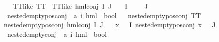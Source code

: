 \begin{isabellebody}
\ \ \isanewline
{\isachardoublequoteopen}TT{\isacharunderscore}{\kern0pt}like\ TT{\isachardoublequoteclose}\ {\isacharbar}{\kern0pt}\isanewline
{\isachardoublequoteopen}TT{\isacharunderscore}{\kern0pt}like\ {\isacharparenleft}{\kern0pt}hml{\isacharunderscore}{\kern0pt}conj\ I\ J\ {\isasymPhi}{\isacharparenright}{\kern0pt}{\isachardoublequoteclose}\ \ {\isachardoublequoteopen}{\isacharparenleft}{\kern0pt}{\isasymPhi}\ {\isacharbackquote}{\kern0pt}I{\isacharparenright}{\kern0pt}\ {\isacharequal}{\kern0pt}\ {\isacharbraceleft}{\kern0pt}{\isacharbraceright}{\kern0pt}{\isachardoublequoteclose}\ {\isachardoublequoteopen}{\isacharparenleft}{\kern0pt}{\isasymPhi}\ {\isacharbackquote}{\kern0pt}\ J{\isacharparenright}{\kern0pt}\ {\isacharequal}{\kern0pt}\ {\isacharbraceleft}{\kern0pt}{\isacharbraceright}{\kern0pt}{\isachardoublequoteclose}\isanewline
\isanewline
{}\isamarkupfalse%
\ nested{\isacharunderscore}{\kern0pt}empty{\isacharunderscore}{\kern0pt}pos{\isacharunderscore}{\kern0pt}conj\ {\isacharcolon}{\kern0pt}{\isacharcolon}{\kern0pt}\ {\isachardoublequoteopen}{\isacharparenleft}{\kern0pt}{\isacharprime}{\kern0pt}a{\isacharcomma}{\kern0pt}\ {\isacharprime}{\kern0pt}i{\isacharparenright}{\kern0pt}\ hml\ {\isasymRightarrow}\ bool{\isachardoublequoteclose}\isanewline
\ \ \isanewline
{\isachardoublequoteopen}nested{\isacharunderscore}{\kern0pt}empty{\isacharunderscore}{\kern0pt}pos{\isacharunderscore}{\kern0pt}conj\ TT{\isachardoublequoteclose}\ {\isacharbar}{\kern0pt}\isanewline
{\isachardoublequoteopen}nested{\isacharunderscore}{\kern0pt}empty{\isacharunderscore}{\kern0pt}pos{\isacharunderscore}{\kern0pt}conj\ {\isacharparenleft}{\kern0pt}hml{\isacharunderscore}{\kern0pt}conj\ I\ J\ {\isasymPhi}{\isacharparenright}{\kern0pt}{\isachardoublequoteclose}\ \isanewline
{}\ {\isachardoublequoteopen}{\isasymforall}x\ {\isasymin}\ {\isacharparenleft}{\kern0pt}{\isasymPhi}\ {\isacharbackquote}{\kern0pt}I{\isacharparenright}{\kern0pt}{\isachardot}{\kern0pt}\ nested{\isacharunderscore}{\kern0pt}empty{\isacharunderscore}{\kern0pt}pos{\isacharunderscore}{\kern0pt}conj\ x{\isachardoublequoteclose}\ {\isachardoublequoteopen}{\isacharparenleft}{\kern0pt}{\isasymPhi}\ {\isacharbackquote}{\kern0pt}\ J{\isacharparenright}{\kern0pt}\ {\isacharequal}{\kern0pt}\ {\isacharbraceleft}{\kern0pt}{\isacharbraceright}{\kern0pt}{\isachardoublequoteclose}\isanewline
\isanewline
{}\isamarkupfalse%
\ nested{\isacharunderscore}{\kern0pt}empty{\isacharunderscore}{\kern0pt}conj\ {\isacharcolon}{\kern0pt}{\isacharcolon}{\kern0pt}\ {\isachardoublequoteopen}{\isacharparenleft}{\kern0pt}{\isacharprime}{\kern0pt}a{\isacharcomma}{\kern0pt}\ {\isacharprime}{\kern0pt}i{\isacharparenright}{\kern0pt}\ hml\ {\isasymRightarrow}\ bool{\isachardoublequoteclose}\isanewline

\end{isabellebody}
